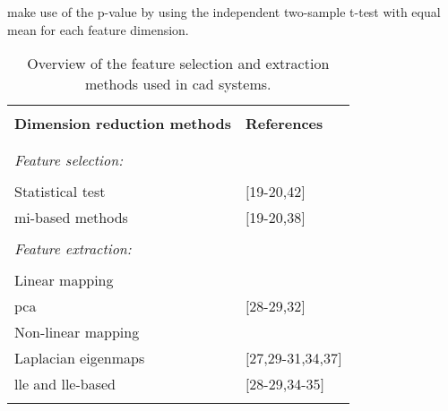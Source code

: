 \cite{Niaf2011,Niaf2012} make use of the p-value by using the independent two-sample t-test with equal mean for each feature dimension. %
%
%
\begin{table}
	\caption{Overview of the feature selection and extraction methods used in \ac{cad} systems.}
	\small
	\renewcommand{\arraystretch}{.8}
	\begin{tabular}{p{.65\linewidth} p{.25\linewidth}}
		\hline \\ [-1.5ex]
		\textbf{Dimension reduction methods} & \textbf{References} \\ \\ [-1.5ex]
		\hline \\ [-1.5ex]
		\textit{Feature selection:} & \\ \\ [-1.5ex]
		\quad Statistical test & $[$19-20,42$]$ \\
		\quad \ac{mi}-based methods & $[$19-20,38$]$ \\ \\ [-1.5ex]
		\textit{Feature extraction:} & \\ \\ [-1.5ex]
		\quad Linear mapping & \\
		\quad \quad \acs{pca} & $[$28-29,32$]$ \\
		\quad Non-linear mapping & \\
		\quad \quad Laplacian eigenmaps & $[$27,29-31,34,37$]$ \\
		\quad \quad \acs{lle} and \acs{lle}-based & $[$28-29,34-35$]$ \\ \\ [-1.5ex]
		\hline
	\end{tabular}
	\label{tab:featext}
\end{table} 

